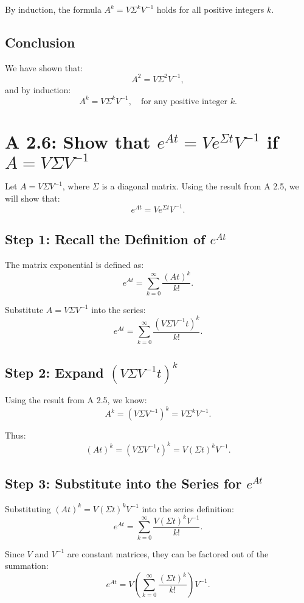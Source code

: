 \documentclass[12pt]{article}
\begin{document}
By induction, the formula \(A^k = V \Sigma^k V^{-1}\) holds for all positive integers \(k\).

\subsection*{Conclusion}

We have shown that:
\[
A^2 = V \Sigma^2 V^{-1},
\]
and by induction:
\[
A^k = V \Sigma^k V^{-1}, \quad \text{for any positive integer } k.
\]

\section*{A 2.6: Show that \(e^{At} = V e^{\Sigma t} V^{-1}\) if \(A = V \Sigma V^{-1}\)}

Let \(A = V \Sigma V^{-1}\), where \(\Sigma\) is a diagonal matrix. Using the result from A 2.5, we will show that:
\[
e^{At} = V e^{\Sigma t} V^{-1}.
\]

\subsection*{Step 1: Recall the Definition of \(e^{At}\)}

The matrix exponential is defined as:
\[
e^{At} = \sum_{k=0}^\infty \frac{(At)^k}{k!}.
\]

Substitute \(A = V \Sigma V^{-1}\) into the series:
\[
e^{At} = \sum_{k=0}^\infty \frac{(V \Sigma V^{-1} t)^k}{k!}.
\]

\subsection*{Step 2: Expand \((V \Sigma V^{-1} t)^k\)}

Using the result from A 2.5, we know:
\[
A^k = (V \Sigma V^{-1})^k = V \Sigma^k V^{-1}.
\]

Thus:
\[
(At)^k = (V \Sigma V^{-1} t)^k = V (\Sigma t)^k V^{-1}.
\]

\subsection*{Step 3: Substitute into the Series for \(e^{At}\)}

Substituting \((At)^k = V (\Sigma t)^k V^{-1}\) into the series definition:
\[
e^{At} = \sum_{k=0}^\infty \frac{V (\Sigma t)^k V^{-1}}{k!}.
\]

Since \(V\) and \(V^{-1}\) are constant matrices, they can be factored out of the summation:
\[
e^{At} = V \left( \sum_{k=0}^\infty \frac{(\Sigma t)^k}{k!} \right) V^{-1}.
\]
\end{document}
